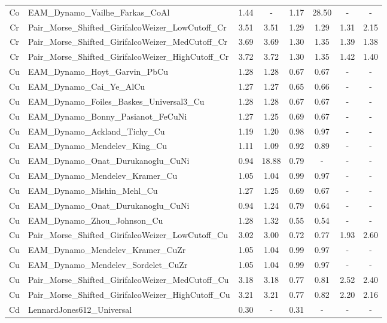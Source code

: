 \documentclass[%
 reprint,
 amsmath,amssymb,
 aps,
]{revtex4-1}
\begin{document}
\begin{longtable*}{@{\extracolsep{\fill}} c l c c c c c c}
 Co & EAM\_Dynamo\_Vailhe\_Farkas\_CoAl & 1.44 & - & 1.17 & 28.50 & - & - \\
 Cr & Pair\_Morse\_Shifted\_GirifalcoWeizer\_LowCutoff\_Cr & 3.51 & 3.51 & 1.29 & 1.29 & 1.31 & 2.15 \\
 Cr & Pair\_Morse\_Shifted\_GirifalcoWeizer\_MedCutoff\_Cr & 3.69 & 3.69 & 1.30 & 1.35 & 1.39 & 1.38 \\
 Cr & Pair\_Morse\_Shifted\_GirifalcoWeizer\_HighCutoff\_Cr & 3.72 & 3.72 & 1.30 & 1.35 & 1.42 & 1.40 \\
 Cu & EAM\_Dynamo\_Hoyt\_Garvin\_PbCu & 1.28 & 1.28 & 0.67 & 0.67 & - & - \\
 Cu & EAM\_Dynamo\_Cai\_Ye\_AlCu & 1.27 & 1.27 & 0.65 & 0.66 & - & - \\
 Cu & EAM\_Dynamo\_Foiles\_Baskes\_Universal3\_Cu & 1.28 & 1.28 & 0.67 & 0.67 & - & - \\
 Cu & EAM\_Dynamo\_Bonny\_Pasianot\_FeCuNi & 1.27 & 1.25 & 0.69 & 0.67 & - & - \\
 Cu & EAM\_Dynamo\_Ackland\_Tichy\_Cu & 1.19 & 1.20 & 0.98 & 0.97 & - & - \\
 Cu & EAM\_Dynamo\_Mendelev\_King\_Cu & 1.11 & 1.09 & 0.92 & 0.89 & - & - \\
 Cu & EAM\_Dynamo\_Onat\_Durukanoglu\_CuNi & 0.94 & 18.88 & 0.79 & - & - & - \\
 Cu & EAM\_Dynamo\_Mendelev\_Kramer\_Cu & 1.05 & 1.04 & 0.99 & 0.97 & - & - \\
 Cu & EAM\_Dynamo\_Mishin\_Mehl\_Cu & 1.27 & 1.25 & 0.69 & 0.67 & - & - \\
 Cu & EAM\_Dynamo\_Onat\_Durukanoglu\_CuNi & 0.94 & 1.24 & 0.79 & 0.64 & - & - \\
 Cu & EAM\_Dynamo\_Zhou\_Johnson\_Cu & 1.28 & 1.32 & 0.55 & 0.54 & - & - \\
 Cu & Pair\_Morse\_Shifted\_GirifalcoWeizer\_LowCutoff\_Cu & 3.02 & 3.00 & 0.72 & 0.77 & 1.93 & 2.60 \\
 Cu & EAM\_Dynamo\_Mendelev\_Kramer\_CuZr & 1.05 & 1.04 & 0.99 & 0.97 & - & - \\
 Cu & EAM\_Dynamo\_Mendelev\_Sordelet\_CuZr & 1.05 & 1.04 & 0.99 & 0.97 & - & - \\
 Cu & Pair\_Morse\_Shifted\_GirifalcoWeizer\_MedCutoff\_Cu & 3.18 & 3.18 & 0.77 & 0.81 & 2.52 & 2.40 \\
 Cu & Pair\_Morse\_Shifted\_GirifalcoWeizer\_HighCutoff\_Cu & 3.21 & 3.21 & 0.77 & 0.82 & 2.20 & 2.16 \\
 Cd & LennardJones612\_Universal & 0.30 & - & 0.31 & - & - & - \\

\end{longtable*}
\end{document}
